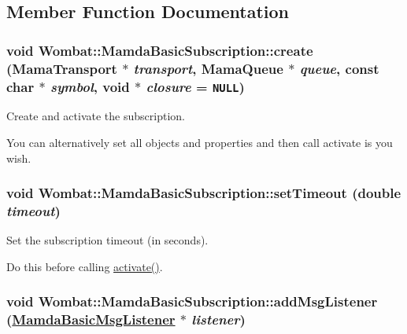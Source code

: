\subsection{Member Function Documentation}
\hypertarget{classWombat_1_1MamdaBasicSubscription_3c27e4c6bf7b6c23464049840aff22e0}{
\subsubsection[create]{\setlength{\rightskip}{0pt plus 5cm}void Wombat::Mamda\-Basic\-Subscription::create (Mama\-Transport $\ast$ {\em transport}, Mama\-Queue $\ast$ {\em queue}, const char $\ast$ {\em symbol}, void $\ast$ {\em closure} = {\tt NULL})}}
\label{classWombat_1_1MamdaBasicSubscription_3c27e4c6bf7b6c23464049840aff22e0}


Create and activate the subscription. 

You can alternatively set all objects and properties and then call activate is you wish. \hypertarget{classWombat_1_1MamdaBasicSubscription_8c1d89cc23a0231367c494c780c9bf60}{
\subsubsection[setTimeout]{\setlength{\rightskip}{0pt plus 5cm}void Wombat::Mamda\-Basic\-Subscription::set\-Timeout (double {\em timeout})}}
\label{classWombat_1_1MamdaBasicSubscription_8c1d89cc23a0231367c494c780c9bf60}


Set the subscription timeout (in seconds). 

Do this before calling \hyperlink{classWombat_1_1MamdaBasicSubscription_704ba0b8ec4c027d0357d3e482314605}{activate()}. \hypertarget{classWombat_1_1MamdaBasicSubscription_85589ccc88a8e13160b56060fd97450c}{
\subsubsection[addMsgListener]{\setlength{\rightskip}{0pt plus 5cm}void Wombat::Mamda\-Basic\-Subscription::add\-Msg\-Listener (\hyperlink{classWombat_1_1MamdaBasicMsgListener}{Mamda\-Basic\-Msg\-Listener} $\ast$ {\em listener})}}
\label{classWombat_1_1MamdaBasicSubscription_85589ccc88a8e13160b56060fd97450c}


